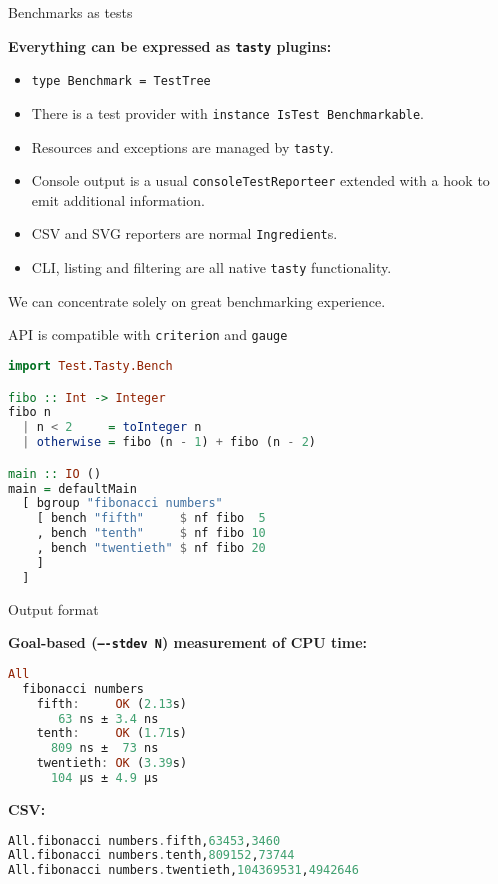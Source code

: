 \documentclass[handout]{beamer}
\begin{document}
\begin{frame}{Benchmarks as tests}

{\bf Everything can be expressed as {\tt tasty} plugins:}
\begin{itemize}[<+->]
\item {\tt type Benchmark = TestTree}
\item There is a test provider with {\tt instance IsTest Benchmarkable}.
\item Resources and exceptions are managed by {\tt tasty}.
\item Console output is a usual {\tt consoleTestReporteer}
      extended with a hook to emit additional information.
\item CSV and SVG reporters are normal {\tt Ingredient}s.
\item CLI, listing and filtering are all native {\tt tasty} functionality.
\end{itemize}

\pause
\bigskip

We can concentrate solely on great benchmarking experience.

\end{frame}

\begin{frame}[fragile]{API is compatible with {\tt criterion} and {\tt gauge}}

\begin{lstlisting}[language=Haskell]
import Test.Tasty.Bench

fibo :: Int -> Integer
fibo n
  | n < 2     = toInteger n
  | otherwise = fibo (n - 1) + fibo (n - 2)

main :: IO ()
main = defaultMain
  [ bgroup "fibonacci numbers"
    [ bench "fifth"     $ nf fibo  5
    , bench "tenth"     $ nf fibo 10
    , bench "twentieth" $ nf fibo 20
    ]
  ]
\end{lstlisting}

\end{frame}

\begin{frame}[fragile]{Output format}

{\bf Goal-based ({\tt ----stdev N}) measurement of CPU time:}
\begin{lstlisting}[language=Haskell]
All
  fibonacci numbers
    fifth:     OK (2.13s)
       63 ns ± 3.4 ns
    tenth:     OK (1.71s)
      809 ns ±  73 ns
    twentieth: OK (3.39s)
      104 μs ± 4.9 μs
\end{lstlisting}

\pause\bigskip

{\bf CSV:}
\begin{lstlisting}[language=Haskell]
All.fibonacci numbers.fifth,63453,3460
All.fibonacci numbers.tenth,809152,73744
All.fibonacci numbers.twentieth,104369531,4942646
\end{lstlisting}

\end{frame}
\end{document}
